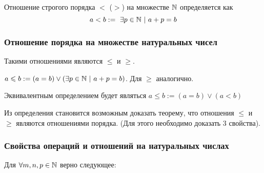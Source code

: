 \begin{definition}
    Отношение строгого порядка $<$ ($>$) на множестве $\mathbb{N}$ определяется как
    $$
        a < b :=\ \exists p \in \mathbb{N}\ |\ a + p = b
    $$
\end{definition}

\subsubsection*{Отношение порядка на множестве натуральных чисел}

Такими отношениями являются $\le$ и $\ge$.
\begin{definition}
    $a \le b := (a = b) \vee (\exists p \in \N\ |\ a + p = b)$. Для $\ge$ аналогично.
\end{definition}

\begin{anote}
    Эквивалентным определением будет являться $a \le b := (a = b) \vee (a < b)$
\end{anote}

Из определения становится возможным доказать теорему, что отношения $\le$ и $\ge$ являются отношениями порядка. (Для этого необходимо доказать 3 свойства).

\subsubsection*{Свойства операций и отношений на натуральных числах}

Для $\forall m, n, p \in \mathbb{N}$ верно следующее:

